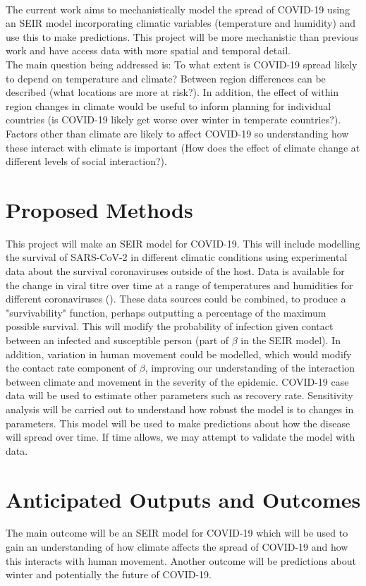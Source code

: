 \documentclass[11pt]{article}
\begin{document}
\\
The current work aims to mechanistically model the spread of COVID-19 using an SEIR model incorporating climatic variables (temperature and humidity) and use this to make predictions. This project will be more mechanistic than previous work and have access data with more spatial and temporal detail.\\
The main question being addressed is: To what extent is COVID-19 spread likely to depend on temperature and climate? Between region differences can be described (what locations are more at risk?). In addition, the effect of within region changes in climate would be useful to inform planning for individual countries (is COVID-19 likely get worse over winter in temperate countries?). Factors other than climate are likely to affect COVID-19 so understanding how these interact with climate is important (How does the effect of climate change at different levels of social interaction?).
\section{Proposed Methods}
This project will make an SEIR model for COVID-19. This will include modelling the survival of SARS-CoV-2 in different climatic conditions using experimental data about the survival coronaviruses outside of the host. Data is available for the change in viral titre over time at a range of temperatures and humidities for different coronaviruses (\cite{Lai2005SurvivalCoronavirus,Chin2020StabilityConditions,vanDoremalen2013StabilityConditions,Pyankov2018SurvivalAir,Casanova2010EffectsSurfaces}). These data sources could be combined, to produce a "survivability" function, perhaps outputting a percentage of the maximum possible survival. This will modify the probability of infection given contact between an infected and susceptible person (part of $\beta$ in the SEIR model). In addition, variation in human movement could be modelled, which would modify the contact rate component of $\beta$, improving our understanding of the interaction between climate and movement in the severity of the epidemic. COVID-19 case data will be used to estimate other parameters such as recovery rate. Sensitivity analysis will be carried out to understand how robust the model is to changes in parameters. This model will be used to make predictions about how the disease will spread over time. If time allows, we may attempt to validate the model with data.
\section{Anticipated Outputs and Outcomes}
The main outcome will be an SEIR model for COVID-19 which will be used to gain an understanding of how climate affects the spread of COVID-19 and how this interacts with human movement. Another outcome will be predictions about winter and potentially the future of COVID-19.
\end{document}
